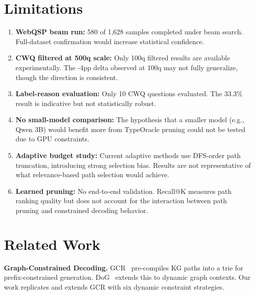 \documentclass[11pt,twoside]{article}
\begin{document}
\section{Limitations}
\label{sec:limitations}

\begin{enumerate}
  \item \textbf{WebQSP beam run:} 580 of 1,628 samples completed under beam
        search. Full-dataset confirmation would increase statistical confidence.
  \item \textbf{CWQ filtered at 500q scale:} Only 100q filtered results are
        available experimentally. The -4pp delta observed at 100q may not fully
        generalize, though the direction is consistent.
  \item \textbf{Label-reason evaluation:} Only 10 CWQ questions evaluated. The
        33.3\% result is indicative but not statistically robust.
  \item \textbf{No small-model comparison:} The hypothesis that a smaller model
        (e.g., Qwen 3B) would benefit more from TypeOracle pruning could not be
        tested due to GPU constraints.
  \item \textbf{Adaptive budget study:} Current adaptive methods use DFS-order
        path truncation, introducing strong selection bias. Results are not
        representative of what relevance-based path selection would achieve.
  \item \textbf{Learned pruning:} No end-to-end validation. Recall@K measures
        path ranking quality but does not account for the interaction between
        path pruning and constrained decoding behavior.
\end{enumerate}

\section{Related Work}
\label{sec:related}

\textbf{Graph-Constrained Decoding.} GCR~\citep{luo2025-graph-constrained-reasoning}
pre-compiles KG paths into a trie for prefix-constrained generation.
DoG~\citep{li2024-decoding-on-graphs} extends this to dynamic graph contexts.
Our work replicates and extends GCR with six dynamic constraint strategies.
\end{document}

